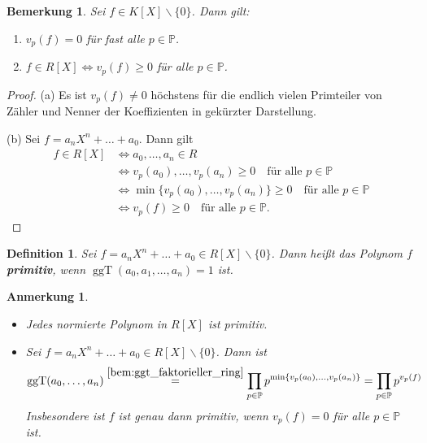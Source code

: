 \documentclass[a4paper, twoside, 11pt, ngerman]{report}
\newcommand{\PP}{\mathds P}
\renewcommand{\setminus}{\smallsetminus}
\DeclareMathOperator{\ggT}{ggT}
\theoremstyle{definistyle}
\newtheorem{defini}[satz]{Definition}
\newtheorem{bem}[satz]{Bemerkung}
\newtheorem{anm}[satz]{Anmerkung}
\theoremstyle{remark}
\newcommand{\defn}[1]{\textit{\bfseries #1}}
\begin{document}
\begin{bem}\label{bem:bewertung_von_polynomen}
Sei $f \in K[X] \setminus \{0\}$. Dann gilt:
\begin{enumerate}[label=(\alph*)]
    \item $v_p(f) = 0$ für fast alle $p \in \PP$.
    \item $f \in R[X] \iff v_p(f) \geq 0$ für alle $p \in \PP$.
\end{enumerate}
\end{bem}

\begin{proof}
(a) Es ist $v_p(f) \neq 0$ höchstens für die endlich vielen Primteiler von Zähler und Nenner der Koeffizienten in gekürzter Darstellung.

(b) Sei $f = a_n X^n + \ldots + a_0$. Dann gilt
\begin{align*}
f \in R[X] &\iff a_0, \ldots, a_n \in R \\
    &\iff v_p(a_0), \ldots, v_p(a_n) \geq 0 \quad \text{für alle } p \in \PP \\
    &\iff \min \{v_p(a_0), \ldots, v_p(a_n)\} \geq 0 \quad \text{für alle } p \in \PP \\
    &\iff v_p(f) \geq 0 \quad \text{für alle } p \in \PP.
\end{align*}
\end{proof}

\begin{defini}
Sei $f=a_nX^n+\ldots+a_0\in R[X]\setminus\{0\}$. Dann heißt das Polynom $f$ \defn{primitiv}, wenn $\ggT(a_0,a_1,\ldots,a_n)=1$ ist.    
\end{defini}

\begin{anm}\label{anm:primitive_polynome}
\begin{itemize}
\item Jedes normierte Polynom in $R[X]$ ist primitiv.
    \item Sei $f = a_n X^n + \ldots + a_0 \in R[X] \setminus \{0\}$. Dann ist
    \[
    \ggT(a_0, \ldots, a_n) \overset{\ref{bem:ggt_faktorieller_ring}}{=} \prod_{p \in \mathbb{P}} p^{\min\{v_p(a_0), \ldots, v_p(a_n)\}} = \prod_{p \in \mathbb{P}} p^{v_p(f)}
    \]
    Insbesondere ist $f$ ist genau dann primitiv, wenn $v_p(f) = 0$ für alle $p\in\PP$ ist.
\end{itemize}
\end{anm}
\end{document}

